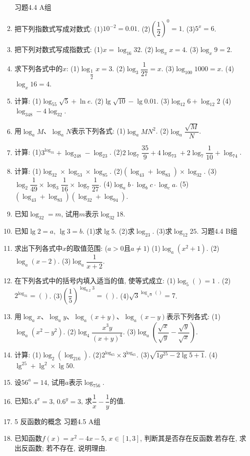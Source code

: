\documentclass[10pt,a4paper]{article}
\begin{document}
\begin{enumerate}[1.]
习题4.4  A组
\item 把下列指数式写成对数式:
(1)$10^{-2}=0.01$.						(2)$(\dfrac 12)^0=1$.
(3)$5^x=6$.
\item 把下列对数式写成指数式:
(1)$x=\log _{16}32$.					(2)$\log _{\pi }x=4$.
(3)$\log _x9=2$.
\item 求下列各式中的$x$:
(1)$\log _{\dfrac 12}x=3$.						(2)$\log _3\dfrac 1{27}=x$.
(3)$\log _{100}1000=x$.					(4)$\log _x16=4$.
\item 计算:
(1)$\log _55\sqrt 5+\ln e$.					(2)$\lg \sqrt {10}-\lg 0.01$.
(3)$\log _{12}6+\log _{12}2$					(4)$\log _348-4\log _32$.
\item 用$\log _aM$、$\log _aN$表示下列各式:
(1)$\log _aMN^2$.						(2)$\log _a\dfrac{\sqrt M}N$.
\item 计算:
(1)$3^{\log _31}+\log _248-\log _23$.
(2)$2\log _7\dfrac{35}9+4\log _73+2\log _7\dfrac 1{10}+\log _74$.
\item 计算:
(1)$\log _32\times \log _53\times \log _85$.			(2)$(\log _43+\log _83)\times \log _32$.
(3)$\log _2\dfrac 1{49}\times \log _3\dfrac 1{16}\times \log _7\dfrac 1{27}$.		(4)$\log _ab\cdot \log _bc\cdot \log _ca$.
(5)$(\log _43+\log _83)(\log _32+\log _94)$.
\item 已知$\log _32=m$, 试用$m$表示$\log _{32}18$.
\item 已知$\lg 2=a$, $\lg 3=b$.
(1)求$\lg 5$.
(2)求$\log _23$.
(3)求$\log _{12}25$.
习题4.4  B组
\item 求出下列各式中$x$的取值范围: ($a>0$且$a\ne 1$)
(1)$\log _a(x^2+1)$.					(2)$\log _a(x-2)$.
(3)$\log _a\dfrac 1{x+2}$.
\item 在下列各式中的括号内填入适当的值, 使等式成立:
(1)$\log _5()=1$	.					(2)$2^{\log _31}=()$.
(3)$(\dfrac 15)^{\log _{0.2}3}=()$.					(4)$\sqrt 3^{\log _{\sqrt 3}()}=7$.
\item 用$\log _ax$、$\log _ay$、$\log _a(x+y)$、$\log _a(x-y)$表示下列各式:
(1)$\log _a(x^2-y^2)$.					(2)$\log _4\dfrac{{x^3}y}{{{(x+y)}^4}}$.
(3)$\log _a(\dfrac{\sqrt x}{\sqrt y}-\dfrac{\sqrt y}{\sqrt x})$.
\item 计算:
(1)$\log _2(\log _216)$.					(2)$2^{\log _65}\times 3^{\log _65}$.
(3)$\sqrt {1g^25-2\lg 5+1}$.				(4)$\lg ^25+\lg ^2\times \lg 50$.
\item 设$56^a=14$, 试用$a$表示$\log _756$.
\item 已知$5.4^x=3$, $0.6^y=3$, 求$\dfrac 1x-\dfrac 1y$的值.
\item 5  反函数的概念
习题4.5  A组
\item 已知函数$f(x)=x^2-4x-5$, $x\in [1,3]$, 判断其是否存在反函数.若存在, 求出反函数; 若不存在, 说明理由.

\end{enumerate}
\end{document}
